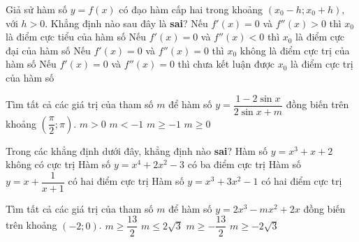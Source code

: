 \begin{ex}%
Giả sử hàm số $y=f(x)$ có đạo hàm cấp hai trong khoảng $(x_0-h;x_0+h),$ với $h>0$. Khẳng định nào sau đây là \textbf{sai}?
\choice
{Nếu $f'(x)=0$ và $f''(x)>0$ thì $x_0$ là điểm cực tiểu của hàm số}
{Nếu $f'(x)=0$ và $f''(x)<0$ thì $x_0$ là điểm cực đại của hàm số}
{\True Nếu $f'(x)=0$ và $f''(x)=0$ thì $x_0$ không là điểm cực trị của hàm số}
{Nếu $f'(x)=0$ và $f''(x)=0$ thì chưa kết luận được $x_0$ là điểm cực trị của hàm số}
\end{ex}

\begin{ex}%
Tìm tất cả các giá trị của tham số $m$ để hàm số $y=\dfrac{1-2\sin x}{2\sin x+m}$ đồng biến trên khoảng $\left(\dfrac{\pi}{2};\pi\right)$.
\choice
{$m>0$}
{$m<-1$}
{$m\geq -1$}
{\True $m\geq 0$}
\end{ex}

\begin{ex}%
Trong các khẳng định dưới đây, khẳng định nào \textbf{sai}?
\choice
{Hàm số $y=x^3+x+2$ không có cực trị}
{\True Hàm số $y=x^4+2x^2-3$ có ba điểm cực trị}
{Hàm số $y=x+\dfrac{1}{x+1}$ có hai điểm cực trị}
{Hàm số $y=x^3+3x^2-1$ có hai điểm cực trị}
\end{ex}

\begin{ex}%
Tìm tất cả các giá trị của tham số $m$ để hàm số $y=2x^3-mx^2+2x$ đồng biến trên khoảng $(-2;0)$.
\choice
{$m\geq \dfrac{13}{2}$}
{$m\leq 2\sqrt{3}$}
{$m\geq -\dfrac{13}{2}$}
{\True $m\geq -2\sqrt{3}$}
\end{ex}

